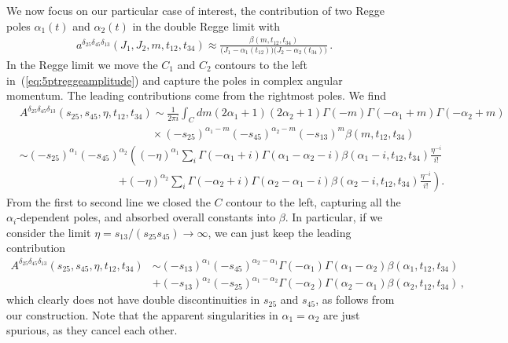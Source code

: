 We now focus on our particular case of interest, the contribution of two Regge poles $\alpha_1(t)$ and $\alpha_2(t)$ in the double Regge limit with
\begin{align}
  a^{\delta_{25}\delta_{45}\delta_{13}}(J_1,J_2, m,t_{12},t_{34})\approx \frac{\beta(m, t_{12},t_{34})}{\big(J_1-\alpha_1(t_{12})\big)\big(J_2-\alpha_2(t_{34})\big)}\,.
\end{align}
In the Regge limit we move the $C_1$ and $C_2$ contours to the left in~(\ref{eq:5ptreggeamplitude}) and capture the poles in complex angular momentum. The leading contributions come from the rightmost poles. We find
\begin{align}
  \label{eq:5ptreggetheory}
   & A^{\delta_{25}\delta_{45}\delta_{13}}(s_{25}, s_{45},\eta, t_{12}, t_{34}) \sim\frac{1}{2\pi i}\int_C dm(2 \alpha_1+1)(2 \alpha_2+1)\Gamma(-m) \Gamma(-\alpha_1+m)\Gamma(-\alpha_2+m)\nonumber    \\
   & \qquad\qquad\qquad\qquad\qquad\qquad \times(-s_{25})^{\alpha_1-m}(-s_{45})^{\alpha_2-m}(-s_{13})^{m}\beta(m,t_{12},t_{34})\nonumber                                                   \\
   & \sim(-s_{25})^{\alpha_1}(-s_{45})^{\alpha_2} \left((-\eta)^{\alpha_1}\sum_{i}\Gamma(-\alpha_1+i)\Gamma(\alpha_1-\alpha_2-i)\beta(\alpha_1-i,t_{12},t_{34})\frac{\eta^{-i}}{i!}\right. \\
   & \qquad\qquad\qquad\qquad\quad
  \left.+(-\eta)^{\alpha_2}\sum_{i}\Gamma(-\alpha_2+i)\Gamma(\alpha_2-\alpha_1-i)\beta(\alpha_2-i,t_{12},t_{34})\frac{\eta^{-i}}{i!}\right).\nonumber
\end{align}
From the first to second line we closed the $C$ contour to the left, capturing all the $\alpha_i$-dependent poles, and absorbed overall constants into $\beta$.
In particular, if we consider the limit $\eta=s_{13}/(s_{25}s_{45})\to \infty$, we can just keep the leading contribution
\begin{align}
  A^{\delta_{25}\delta_{45}\delta_{13}}(s_{25}, s_{45},\eta, t_{12}, t_{34}) & \sim (-s_{13})^{\alpha_1}(-s_{45})^{\alpha_2-\alpha_1}\Gamma(-\alpha_1)\Gamma(\alpha_1-\alpha_2)\beta(\alpha_1,t_{12},t_{34})\nonumber \\
                                                                             & +(-s_{13})^{\alpha_2}(-s_{25})^{\alpha_1-\alpha_2}\Gamma(-\alpha_2)\Gamma(\alpha_2-\alpha_1)\beta(\alpha_2,t_{12},t_{34})\,,
\end{align}
which clearly does  not have double discontinuities in $s_{25}$ and $s_{45}$, as follows from our construction.
Note that the apparent singularities in $\alpha_1=\alpha_2$ are just spurious, as they cancel each other.

